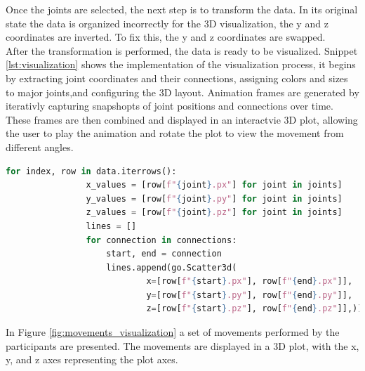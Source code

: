         Once the joints are selected, the next step is to transform the data. In its original state the data is organized incorrectly for the 3D visualization, the y and z coordinates are inverted. To fix this, the y and z coordinates are swapped. \\
        After the transformation is performed, the data is ready to be visualized. Snippet \ref{lst:visualization} shows the implementation of the visualization process, it begins by extracting joint coordinates and their connections, assigning colors and sizes to major joints,and configuring the 3D layout. Animation frames are generated by iterativly capturing snapshopts of joint positions and connections over time. These frames are then combined and displayed in an interactvie 3D plot, allowing the user to play the animation and rotate the plot to view the movement from different angles.

        \begin{lstlisting}[caption={Code snippet creates connecting lines between joints using their 3D coordinates, enabling visualization of joint movements.}, label={lst:visualization}, language=Python]            
            for index, row in data.iterrows():
                x_values = [row[f"{joint}.px"] for joint in joints]
                y_values = [row[f"{joint}.py"] for joint in joints]
                z_values = [row[f"{joint}.pz"] for joint in joints]
                lines = []
                for connection in connections:
                    start, end = connection
                    lines.append(go.Scatter3d(
                            x=[row[f"{start}.px"], row[f"{end}.px"]],
                            y=[row[f"{start}.py"], row[f"{end}.py"]],
                            z=[row[f"{start}.pz"], row[f"{end}.pz"]],))
        \end{lstlisting}
        
        \newpage

        In Figure \ref{fig:movements_visualization} a set of movements performed by the participants are presented. The movements are displayed in a 3D plot, with the x, y, and z axes representing the plot axes. 

